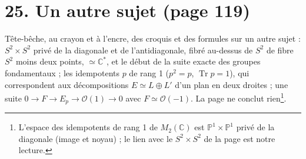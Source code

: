 \documentclass[11pt,a4paper]{article}
\begin{document}
\section*{25. Un autre sujet (page 119)}

Tête-bêche, au crayon et à l'encre, des croquis et des formules sur un autre
sujet : $S^2 \times S^2$ privé de la diagonale et de l'antidiagonale, fibré
au-dessus de $S^2$ de fibre $S^2$ moins deux points, $\simeq \mathbb{C}^*$, et
le début de la suite exacte des groupes fondamentaux ; les idempotents $p$ de
rang 1 ($p^2 = p$, $\operatorname{Tr} p = 1$), qui correspondent aux
décompositions $E \simeq L \oplus L'$ d'un plan en deux droites ; une suite
$0 \to F \to E_p \to \mathcal{O}(1) \to 0$ avec $F \simeq \mathcal{O}(-1)$. La
page ne conclut rien\footnote{L'espace des idempotents de rang 1 de
$M_2(\mathbb{C})$ est $\mathbb{P}^1 \times \mathbb{P}^1$ privé de la diagonale
(image et noyau) ; le lien avec le $S^2 \times S^2$ de la page est notre
lecture.}.
\end{document}
